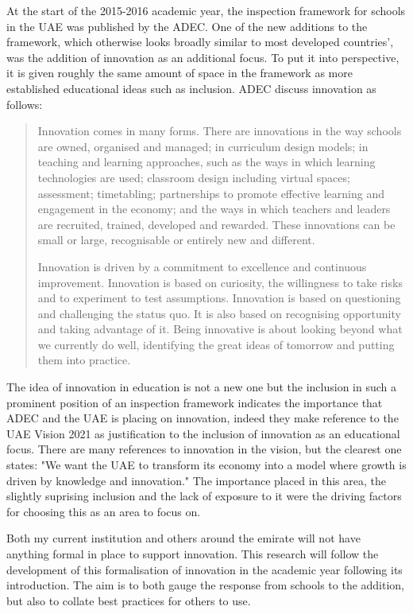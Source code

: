 At the start of the 2015-2016 academic year, the inspection framework for schools in the UAE was published by the ADEC. One of the new additions to the framework, which otherwise looks broadly similar to most developed countries', was the addition of innovation as an additional focus. To put it into perspective, it is given roughly the same amount of space in the framework as more established educational ideas such as inclusion. ADEC discuss innovation as follows:

\begin{quote}
Innovation comes in many forms. There are innovations in the way schools are owned, organised and managed; in curriculum design models; in teaching and learning approaches, such as the ways in which learning technologies are used; classroom design including virtual spaces; assessment; timetabling; partnerships to promote effective learning and engagement in the economy; and the ways in which teachers and leaders are recruited, trained, developed and rewarded. These innovations can be small or large, recognisable or entirely new and different.

Innovation is driven by a commitment to excellence and continuous improvement. Innovation is based on curiosity, the willingness to take risks and to experiment to test assumptions. Innovation is based on questioning and challenging the status quo. It is also based on recognising opportunity and taking advantage of it. Being innovative is about looking beyond what we currently do well, identifying the great ideas of tomorrow and putting them into practice.
\end{quote} \cite[p.12]{ADEC2015}

The idea of innovation in education is not a new one but the inclusion in such a prominent position of an inspection framework indicates the importance that ADEC and the UAE is placing on innovation, indeed they make reference to the UAE Vision 2021 as justification to the inclusion of innovation as an educational focus. There are many references to innovation in the vision, but the clearest one states: "We want the UAE to transform its economy into a model where growth is driven by knowledge and innovation." \cite{UAEGovernment2012} The importance placed in this area, the slightly suprising inclusion and the lack of exposure to it were the driving factors for choosing this as an area to focus on.

Both my current institution and others around the emirate will not have anything formal in place to support innovation. This research will follow the development of this formalisation of innovation in the academic year following its introduction. The aim is to both gauge the response from schools to the addition, but also to collate best practices for others to use.


